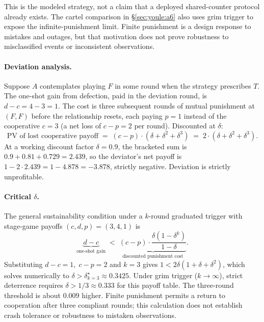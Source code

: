 \documentclass[11pt,a4paper]{article}
\theoremstyle{definition}
\theoremstyle{remark}
\begin{document}
This is the modeled strategy, not a claim that a deployed shared-counter
protocol already exists. The cartel comparison in \S\ref{sec:youle:a6} also uses
grim trigger to expose the infinite-punishment limit. Finite punishment is a
design response to mistakes and outages, but that motivation does not prove
robustness to misclassified events or inconsistent observations.

\paragraph{Deviation analysis.}
Suppose $A$ contemplates playing $F$ in some round when the strategy prescribes $T$. The one-shot gain from defection, paid in the deviation round, is $d - c = 4 - 3 = 1$. The cost is three subsequent rounds of mutual punishment at $(F,F)$ before the relationship resets, each paying $p = 1$ instead of the cooperative $c = 3$ (a net loss of $c - p = 2$ per round). Discounted at $\delta$:
\[
\text{PV of lost cooperative payoff} \;=\; (c - p) \cdot (\delta + \delta^2 + \delta^3) \;=\; 2 \cdot (\delta + \delta^2 + \delta^3).
\]
At a working discount factor $\delta = 0.9$, the bracketed sum is $0.9 + 0.81 + 0.729 = 2.439$, so the deviator's net payoff is $1 - 2 \cdot 2.439 = 1 - 4.878 = -3.878$, strictly negative. Deviation is strictly unprofitable.

\paragraph{Critical $\delta$.}
The general sustainability condition under a $k$-round graduated trigger with stage-game payoffs $(c, d, p) = (3, 4, 1)$ is
\[
\underbrace{d - c}_{\text{one-shot gain}} \;<\; \underbrace{(c - p) \cdot \frac{\delta(1 - \delta^k)}{1 - \delta}}_{\text{discounted punishment cost}}.
\]
Substituting $d - c = 1,\; c - p = 2$ and $k = 3$ gives $1 < 2\delta(1 + \delta + \delta^2)$, which solves numerically to $\delta > \delta^\star_{k=3} \approx 0.3425$. Under grim trigger ($k \to \infty$), strict deterrence requires $\delta > 1/3 \approx 0.333$ for this payoff table. The three-round threshold is about $0.009$ higher. Finite punishment permits a return to cooperation after three compliant rounds; this calculation does not establish crash tolerance or robustness to mistaken observations.
\end{document}
